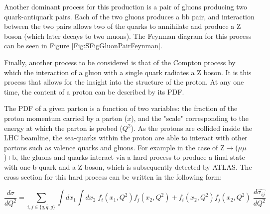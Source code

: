 \documentclass[12pt,a4paper,epsf,portrait,times,epsfig]{report}
\begin{document}
		
		Another dominant process for this production is a pair of gluons producing two quark-antiquark pairs. Each of the two gluons produces a bb pair, and interaction between the two pairs allows two of the quarks to annihilate and produce a Z boson (which later decays to two muons). The Feynman diagram for this process can be seen in Figure \ref{Fig:SFigGluonPairFeynman}. \par
		
		Finally, another process to be considered is that of the Compton process by which the interaction of a gluon with a single quark radiates a Z boson. It is this process that allows for the insight into the structure of the proton. At any one time, the content of a proton can be described by its PDF. \par
		
		The PDF of a given parton is a function of two variables: the fraction of the proton momentum carried by a parton ($x$), and the "scale" corresponding to the energy at which the parton is probed ($Q^{2}$). As the protons are collided inside the LHC beamline, the sea-quarks within the proton are able to interact with other partons such as valence quarks and gluons. For example in the case of Z$\rightarrow$($\mu\mu$)+b, the gluons and quarks interact via a hard process to produce a final state with one b-quark and a Z boson, which is subsequently detected by ATLAS. The cross section for this hard process can be written in the following form:
		

		
		\begin{center}
			\begin{equation}
			\frac{d\sigma}{dQ^{2}}=\sum_{i,j\in \{q,\overline{q},g\}}\int dx_{1}\int dx_{2}\; f_{i}(x_{1},Q^{2})f_{j}(x_{2},Q^{2})+f_{i}(x_{2},Q^{2})f_{j}(x_{2},Q^{2})\;\frac{d\hat{\sigma_{ij}}}{dQ^{2}}
			\end{equation}
		\end{center}
		
\end{document}
